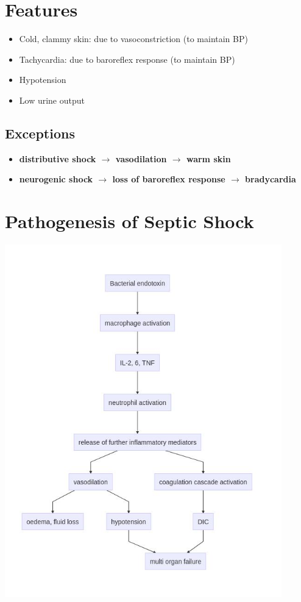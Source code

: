 \documentclass[
  14pt,
]{memoir}
\providecommand{\tightlist}{%
  \setlength{\itemsep}{0pt}\setlength{\parskip}{0pt}}
\begin{document}
\hypertarget{features}{%
\section{Features}\label{features}}

\begin{itemize}
\tightlist
\item
  Cold, clammy skin: due to vasoconstriction (to maintain BP)
\item
  Tachycardia: due to baroreflex response (to maintain BP)
\item
  Hypotension
\item
  Low urine output
\end{itemize}

\hypertarget{exceptions}{%
\subsection{Exceptions}\label{exceptions}}

\begin{itemize}
\tightlist
\item
  \textbf{distributive shock \(\rightarrow\) vasodilation
  \(\rightarrow\) warm skin}
\item
  \textbf{neurogenic shock \(\rightarrow\) loss of baroreflex response
  \(\rightarrow\) bradycardia}
\end{itemize}

\hypertarget{pathogenesis-of-septic-shock}{%
\section{Pathogenesis of Septic
Shock}\label{pathogenesis-of-septic-shock}}

\includegraphics[width=0.9\textwidth]{septicshock.jpg} \pagebreak
\end{document}
